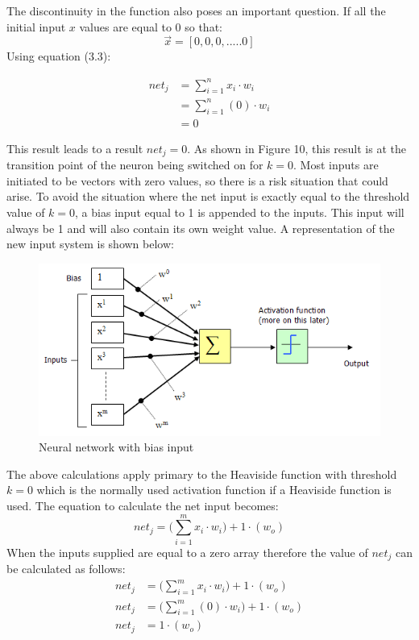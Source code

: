 The discontinuity in the function also poses an important question. If all the initial input $x$ values are equal to 0 so that:
$$\vec{x} = [0,0,0,.....0]$$
Using equation (3.3):

\begin{align*}
	net_j &= \sum_{i=1}^n x_i \cdot w_i \\
	&= \sum_{i=1}^n (0) \cdot w_i\\
	&= 0 
\end{align*}

This result leads to a result $net_j = 0$. As shown in Figure 10, this result is at the transition point of the neuron being switched on for $k=0$. Most inputs are initiated to be vectors with zero values, so there is a risk situation that could arise. To avoid the situation where the net input is exactly equal to the threshold value of $k=0$, a bias input equal to 1 is appended to the inputs. This input will always be 1 and will also contain its own weight value. A representation of the new input system is shown below:

\begin{figure}[h]
	\centering
	\includegraphics[scale=0.6]{29}
	\caption{Neural network with bias input}
\end{figure}

The above calculations apply primary to the Heaviside function with threshold $k=0$ which is the normally used activation function if a  Heaviside function is used. The equation to calculate the net input becomes:
\begin{equation}
	net_j = \big( \sum_{i=1}^m x_i \cdot w_i \big) + 1\cdot (w_o)
\end{equation}
When the inputs supplied are equal to a zero array therefore the value of $net_j$ can be calculated as follows:
\begin{align}
	net_j &= \big( \sum_{i=1}^m x_i \cdot w_i \big) + 1\cdot (w_o)\nonumber \\
	net_j &= \big( \sum_{i=1}^m (0) \cdot w_i \big) + 1\cdot (w_o)\nonumber\\
	net_j &= 1 \cdot (w_o) 
\end{align}

